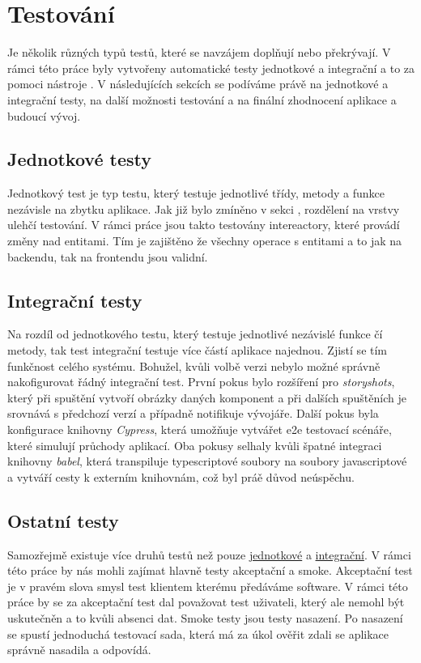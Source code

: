 \chapter{Testování}
\label{ch:testing}
Je několik různých typů testů, které se navzájem doplňují nebo překrývají. V rámci této práce byly vytvořeny automatické testy jednotkové a integrační a to za pomoci nástroje . V následujících sekcích se podíváme právě na jednotkové a integrační testy, na další možnosti testování a na finální zhodnocení aplikace a budoucí vývoj.

\section{Jednotkové testy}
\label{sc:unit_tests}
Jednotkový test je typ testu, který testuje jednotlivé třídy, metody a funkce nezávisle na zbytku aplikace. Jak již bylo zmíněno v sekci , rozdělení na vrstvy ulehčí testování. V rámci práce jsou takto testovány intereactory, které provádí změny nad entitami. Tím je zajištěno že všechny operace s entitami a to jak na backendu, tak na frontendu jsou validní.

\section{Integrační testy}
\label{sc:unit_tests}
Na rozdíl od jednotkového testu, který testuje jednotlivé nezávislé funkce čí metody, tak test integrační testuje více částí aplikace najednou. Zjistí se tím funkčnost celého systému. Bohužel, kvůli volbě verzi  nebylo možné správně nakofigurovat řádný integrační test. První pokus bylo rozšíření pro  \emph{storyshots}, který při spuštění vytvoří obrázky daných komponent a při dalších spuštěních je srovnává s předchozí verzí a případně notifikuje vývojáře. Další pokus byla konfigurace knihovny \emph{Cypress}, která umožňuje vytvářet \acrfull{e2e} testovací scénáře, které simulují průchody aplikací. Oba pokusy selhaly kvůli špatné integraci knihovny \emph{babel}, která transpiluje typescriptové soubory na soubory javascriptové a vytváří cesty k externím knihovnám, což byl práě důvod neúspěchu.

\section{Ostatní testy}
Samozřejmě existuje více druhů testů než pouze \hyperref[sc:unit_tests]{jednotkové} a \hyperref[sc:unit_tests]{integrační}. V rámci této práce by nás mohli zajímat hlavně testy akceptační a smoke. Akceptační test je v pravém slova smysl test klientem kterému předáváme software. V rámci této práce by se za akceptační test dal považovat test uživateli, který ale nemohl být uskutečněn a to kvůli absenci dat. Smoke testy jsou testy nasazení. Po nasazení se spustí jednoduchá testovací sada, která má za úkol ověřit zdali se aplikace správně nasadila a odpovídá.

